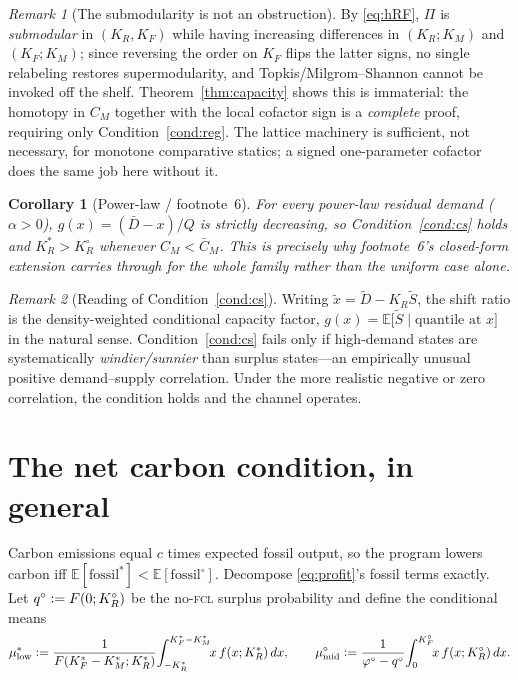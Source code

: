 \documentclass[11pt,reqno]{amsart}
\theoremstyle{plain}
\newtheorem{corollary}{Corollary}
\theoremstyle{definition}
\theoremstyle{remark}
\newtheorem{remark}{Remark}
\newcommand{\KR}{K_R}
\newcommand{\KF}{K_F}
\newcommand{\KM}{K_M}
\newcommand{\KRs}{K_R^{*}}
\newcommand{\KFs}{K_F^{*}}
\newcommand{\KMs}{K_M^{*}}
\newcommand{\KRo}{K_R^{\circ}}
\newcommand{\KFo}{K_F^{\circ}}
\newcommand{\Dbar}{\bar D}
\newcommand{\CM}{C_M}
\newcommand{\CMbar}{\bar C_M}
\newcommand{\E}{\mathbb{E}}
\newcommand{\eqdef}{\vcentcolon=}
\begin{document}
\begin{remark}[The submodularity is not an obstruction]\label{rem:submod}
By \eqref{eq:hRF}, $\Pi$ is \emph{submodular} in $(\KR,\KF)$ while having
increasing differences in $(\KR;\KM)$ and $(\KF;\KM)$; since reversing the order
on $\KF$ flips the latter signs, no single relabeling restores supermodularity,
and Topkis/Milgrom--Shannon cannot be invoked off the shelf. Theorem~\ref{thm:capacity}
shows this is immaterial: the homotopy in $\CM$ together with the local cofactor
sign is a \emph{complete} proof, requiring only Condition~\ref{cond:reg}. The
lattice machinery is sufficient, not necessary, for monotone comparative statics;
a signed one-parameter cofactor does the same job here without it.
\end{remark}

\begin{corollary}[Power-law / footnote~6]\label{cor:power}
For every power-law residual demand ($\alpha>0$), $g(x)=(\Dbar-x)/Q$ is strictly
decreasing, so Condition~\ref{cond:cs} holds and $\KRs>\KRo$ whenever
$\CM<\CMbar$. This is precisely why footnote~6's closed-form extension carries
through for the whole family rather than the uniform case alone.
\end{corollary}

\begin{remark}[Reading of Condition~\ref{cond:cs}]
Writing $\tilde x=\tilde D-\KR\tilde S$, the shift ratio is the
density-weighted conditional capacity factor,
$g(x)=\E\!\big[\tilde S \mid \text{quantile at }x\big]$ in the natural sense.
Condition~\ref{cond:cs} fails only if high-demand states are systematically
\emph{windier/sunnier} than surplus states---an empirically unusual positive
demand--supply correlation. Under the more realistic negative or zero
correlation, the condition holds and the channel operates.
\end{remark}

\section{The net carbon condition, in general}\label{sec:carbon}

Carbon emissions equal $c$ times expected fossil output, so the program lowers
carbon iff $\E[\text{fossil}^{*}]<\E[\text{fossil}^{\circ}]$. Decompose
\eqref{eq:profit}'s fossil terms exactly. Let
$q^{\circ}\eqdef F(0;\KRo)$ be the no-\textsc{fcl} surplus probability and define
the conditional means
\[
  \mu^{*}_{\mathrm{low}}\eqdef
  \frac{1}{F(\KFs-\KMs;\KRs)}\!\int_{-\KRs}^{\KFs-\KMs}\!\!x\,f(x;\KRs)\,dx,
  \qquad
  \mu^{\circ}_{\mathrm{mid}}\eqdef
  \frac{1}{\varphi^{\circ}-q^{\circ}}\!\int_{0}^{\KFo}\!\!x\,f(x;\KRo)\,dx .
\]
\end{document}
